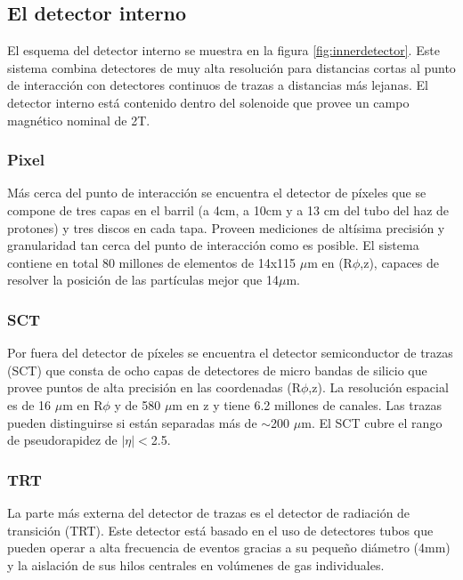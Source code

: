 \subsection{El detector interno}

El esquema del detector interno se muestra en la figura
\ref{fig:innerdetector}\cite{IDTDR}. Este sistema combina detectores de muy alta
resolución para distancias cortas al punto de interacción con detectores
continuos de trazas a distancias más lejanas. El detector interno está contenido
dentro del solenoide que provee un campo magnético nominal de 2T.


\subsubsection{Pixel}
Más cerca del punto de interacción se encuentra el detector de píxeles que se
compone de tres capas en el barril (a 4cm, a 10cm y a 13 cm del tubo del haz de
protones) y tres discos en cada tapa. Proveen mediciones de altísima precisión y
granularidad tan cerca del punto de interacción como es posible. El sistema
contiene en total 80 millones de elementos de 14x115 $\mu$m en (R$\phi$,z),
capaces de resolver la posición de las partículas mejor que 14$\mu$m.

\subsubsection{SCT}
Por fuera del detector de píxeles se encuentra el detector semiconductor de
trazas (SCT) que consta de ocho capas de detectores de micro bandas de silicio
que provee puntos de alta precisión en las coordenadas (R$\phi$,z). La
resolución espacial es de 16 $\mu$m en R$\phi$ y de 580 $\mu$m en z y tiene 6.2
millones de canales. Las trazas pueden distinguirse si están separadas más de
$\sim$200 $ \mu$m. El SCT cubre el rango de pseudorapidez de $|\eta|<$2.5.


\subsubsection{TRT}
La parte más externa del detector de trazas es el detector de radiación de
transición (TRT). Este detector está basado en el uso de detectores tubos que
pueden operar a alta frecuencia de eventos gracias a su pequeño diámetro (4mm) y
la aislación de sus hilos centrales en volúmenes de gas individuales.

